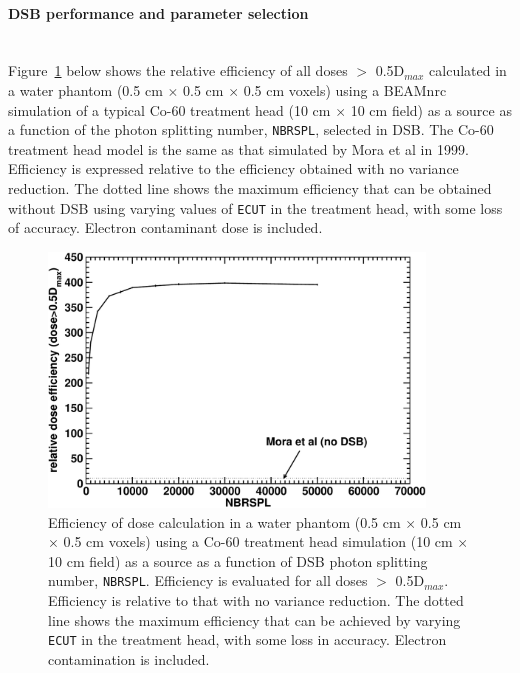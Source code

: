 \documentclass[12pt,twoside]{article}
\begin{document}
\paragraph{DSB performance and parameter selection}\mbox{}\\

Figure~\ref{dsb_deff_fig} below shows the relative efficiency of all doses $>$ 0.5D$_{max}$ calculated in
a water phantom (0.5 cm $\times$ 0.5 cm $\times$ 0.5 cm voxels)  using a BEAMnrc simulation of a
typical Co-60
treatment head (10 cm $\times$ 10 cm field) as a source as a function of the photon
splitting number, {\tt NBRSPL}, selected in DSB.  The Co-60 treatment head model is the same as that
simulated by Mora et al\cite{Mo99} in 1999.  Efficiency is expressed relative
to the efficiency obtained with no variance reduction.  The dotted line shows the maximum efficiency
that can be obtained without DSB using varying values of {\tt ECUT} in the treatment head, with some loss of
accuracy.  Electron contaminant dose is included.

\begin{figure}[htbp]
\begin{center}
\includegraphics[width=10cm]{figures/dsb_deff_vs_nbrspl_espl}
\end{center}
\caption[Performance of DSB]
{Efficiency of dose calculation in a water phantom (0.5 cm $\times$ 0.5 cm $\times$ 0.5 cm voxels) using
a Co-60 treatment head simulation (10 cm $\times$ 10 cm field) as a source as a
function of DSB photon splitting number, {\tt NBRSPL}.  Efficiency is evaluated for all doses $>$ 0.5D$_{max}$.
Efficiency is relative to that with no variance reduction.  The dotted line shows the maximum efficiency
that can be achieved by varying {\tt ECUT} in the treatment head, with some loss in accuracy.  Electron
contamination is included.}
\label{dsb_deff_fig}
\end{figure}
\end{document}
